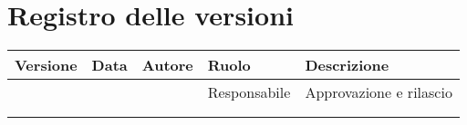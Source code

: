 
\section*{Registro delle versioni}
\begin{table}[H]
     \begin{tabularx}{1.2\textwidth}{|X|X|X|X|p{5cm}|}
        \hline
         \textbf{Versione} &  \textbf{Data} &  \textbf{Autore} &  \textbf{Ruolo} & \textbf{Descrizione} \\
          \hline
          &  &  & Responsabile & Approvazione e rilascio\\
          \hline
          &  &  &  &  \\
          \hline
          &  &  &  &  \\
          \hline
    \end{tabularx}
\end{table}
